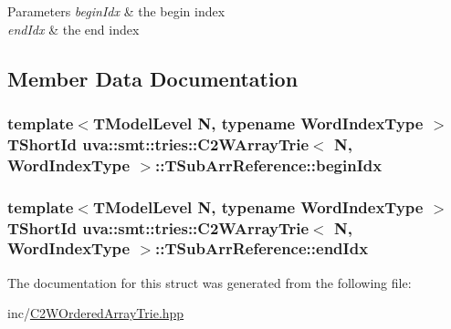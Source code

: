 \begin{DoxyParams}{Parameters}
{\em begin\+Idx} & the begin index \\
\hline
{\em end\+Idx} & the end index \\
\hline
\end{DoxyParams}


\subsection{Member Data Documentation}
\hypertarget{structuva_1_1smt_1_1tries_1_1_c2_w_array_trie_1_1_t_sub_arr_reference_a54b06953fa51f7646c7f491ee4d99372}{}
\subsubsection[{begin\+Idx}]{\setlength{\rightskip}{0pt plus 5cm}template$<$T\+Model\+Level N, typename Word\+Index\+Type $>$ {\bf T\+Short\+Id} {\bf uva\+::smt\+::tries\+::\+C2\+W\+Array\+Trie}$<$ N, {\bf Word\+Index\+Type} $>$\+::T\+Sub\+Arr\+Reference\+::begin\+Idx}\label{structuva_1_1smt_1_1tries_1_1_c2_w_array_trie_1_1_t_sub_arr_reference_a54b06953fa51f7646c7f491ee4d99372}
\hypertarget{structuva_1_1smt_1_1tries_1_1_c2_w_array_trie_1_1_t_sub_arr_reference_a1e7dd8f7b6007d10bb6b888eec498ec0}{}
\subsubsection[{end\+Idx}]{\setlength{\rightskip}{0pt plus 5cm}template$<$T\+Model\+Level N, typename Word\+Index\+Type $>$ {\bf T\+Short\+Id} {\bf uva\+::smt\+::tries\+::\+C2\+W\+Array\+Trie}$<$ N, {\bf Word\+Index\+Type} $>$\+::T\+Sub\+Arr\+Reference\+::end\+Idx}\label{structuva_1_1smt_1_1tries_1_1_c2_w_array_trie_1_1_t_sub_arr_reference_a1e7dd8f7b6007d10bb6b888eec498ec0}


The documentation for this struct was generated from the following file\+:\begin{DoxyCompactItemize}
\item 
inc/\hyperlink{_c2_w_ordered_array_trie_8hpp}{C2\+W\+Ordered\+Array\+Trie.\+hpp}\end{DoxyCompactItemize}
